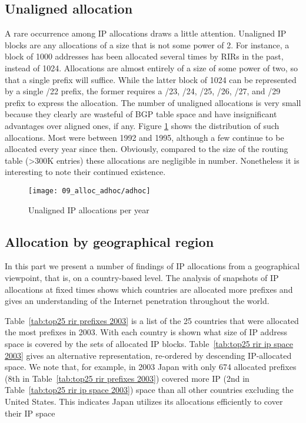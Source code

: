 \subsection{Unaligned allocation}

A rare occurrence among IP allocations draws a little attention.  Unaligned IP blocks are any allocations of a size that is not some power of 2. For
instance, a block of 1000 addresses has been allocated several times by RIRs in the past, instead of 1024. Allocations are almost entirely of a size of some power of two, so that a single prefix will
suffice. While the latter block of 1024 can be represented by a single /22 prefix, the former requires a /23, /24, /25, /26, /27, and /29 prefix to express the allocation.
The number of unaligned allocations is very small because they clearly are
wasteful of BGP table space and have insignificant advantages over aligned ones, if any. Figure
\ref{fig:unaligned IP allocations} shows the distribution of such allocations.
Most were between 1992 and 1995, although a few continue to be allocated every
year since then. Obviously, compared to the size of the routing table (>300K entries) these allocations are negligible in number.  Nonetheless it is interesting to note their continued existence.

\begin{figure}[htbp]
 	\centering
 		\texttt{[image: 09\_alloc\_adhoc/adhoc]}
	\caption{Unaligned IP allocations per year}
 	\label{fig:unaligned IP allocations}
\end{figure}

\subsection{Allocation by geographical region}

In this part we present a number of findings of IP allocations from a geographical viewpoint, that is, on a country-based level. The analysis of snapshots of IP
allocations at fixed times shows which countries are allocated more prefixes and gives an
understanding of the Internet penetration throughout the world.

Table~\ref{tab:top25 rir prefixes 2003} is a list of the 25 countries that were allocated the most prefixes in 2003.  With each country is shown what size of IP
address space is covered by the sets of allocated IP blocks.
Table~\ref{tab:top25 rir ip space 2003} gives an alternative representation, re-ordered by descending IP-allocated space.  We note that, for example, in 2003 Japan with only 674 allocated prefixes (8th in Table~\ref{tab:top25 rir prefixes 2003}) covered more IP (2nd in Table~\ref{tab:top25 rir ip space 2003}) space than all other countries excluding the United States.  This indicates Japan utilizes its allocations efficiently to cover their IP space


